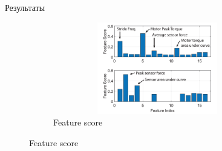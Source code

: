 \begin{frame}[t]{Результаты}
\begin{figure}[H]
        \begin{subfigure}{0.49\textwidth}
            \centering\includegraphics[height=4cm,width=1\textwidth,keepaspectratio]{../images/s_shape_leg/feature_score.png}
            \caption{Feature score}
        \end{subfigure}
    \end{figure}
\end{frame}

